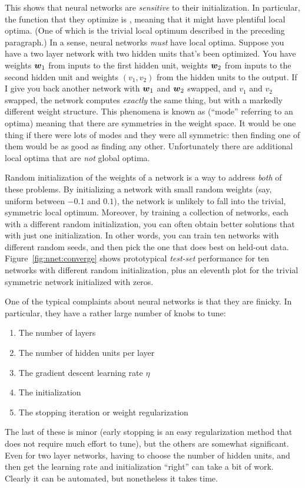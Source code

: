 This shows that neural networks are \emph{sensitive} to their
initialization.  In particular, the function that they optimize is
, meaning that it might have plentiful local
optima.  (One of which is the trivial local optimum described in the
preceding paragraph.)  In a sense, neural networks \emph{must} have
local optima.  Suppose you have a two layer network with two hidden
units that's been optimized.  You have weights ${\boldsymbol{w}}_1$ from inputs to
the first hidden unit, weights ${\boldsymbol{w}}_2$ from inputs to the second
hidden unit and weights $(v_1,v_2)$ from the hidden units to the
output.  If I give you back another network with ${\boldsymbol{w}}_1$ and ${\boldsymbol{w}}_2$
swapped, and $v_1$ and $v_2$ swapped, the network computes
\emph{exactly} the same thing, but with a markedly different weight
structure.  This phenomena is known as 
(``mode'' referring to an optima) meaning that there are symmetries in
the weight space.  It would be one thing if there were lots of modes
and they were all symmetric: then finding one of them would be as good
as finding any other.  Unfortunately there are additional local
optima that are \emph{not} global optima.


Random initialization of the weights of a network is a way to address
\emph{both} of these problems.  By initializing a network with small
random weights (say, uniform between $-0.1$ and $0.1$), the network is
unlikely to fall into the trivial, symmetric local optimum.  Moreover,
by training a collection of networks, each with a different random
initialization, you can often obtain better solutions that with just
one initialization.  In other words, you can train ten networks with
different random seeds, and then pick the one that does best on
held-out data.  Figure~\ref{fig:nnet:converge} shows prototypical
\emph{test-set} performance for ten networks with different random
initialization, plus an eleventh plot for the trivial symmetric
network initialized with zeros.

One of the typical complaints about neural networks is that they are
finicky.  In particular, they have a rather large number of knobs to
tune:
%
\begin{enumerate}
\item The number of layers
\item The number of hidden units per layer
\item The gradient descent learning rate $\eta$
\item The initialization
\item The stopping iteration or weight regularization
\end{enumerate}
%
The last of these is minor (early stopping is an easy regularization
method that does not require much effort to tune), but the others are
somewhat significant.  Even for two layer networks, having to choose
the number of hidden units, and then get the learning rate and
initialization ``right'' can take a bit of work.  Clearly it can be
automated, but nonetheless it takes time.

